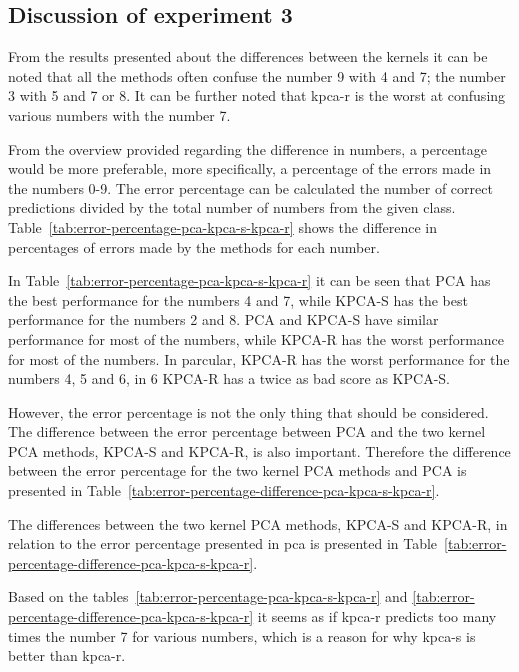 \subsection{Discussion of experiment 3}\label{subsec:discussion-experiment-3}
From the results presented about the differences between the kernels it can be noted that all the methods often confuse the number 9 with 4 and 7; the number 3 with 5 and 7 or 8. It can be further noted that \gls{kpca-r} is the worst at confusing various numbers with the number 7.



From the overview provided regarding the difference in numbers, a percentage would be more preferable, more specifically, a percentage of the errors made in the numbers 0-9. The error percentage can be calculated the number of correct predictions divided by the total number of numbers from the given class. Table~\ref{tab:error-percentage-pca-kpca-s-kpca-r} shows the difference in percentages of errors made by the methods for each number.

In Table~\ref{tab:error-percentage-pca-kpca-s-kpca-r} it can be seen that PCA has the best performance for the numbers 4 and 7, while KPCA-S has the best performance for the numbers 2 and 8. PCA and KPCA-S have similar performance for most of the numbers, while KPCA-R has the worst performance for most of the numbers. In parcular, KPCA-R has the worst performance for the numbers 4, 5 and 6, in 6 KPCA-R has a twice as bad score as KPCA-S. 

However, the error percentage is not the only thing that should be considered. The difference between the error percentage between PCA and the two kernel PCA methods, KPCA-S and KPCA-R, is also important. Therefore the difference between the error percentage for the two kernel PCA methods and PCA is presented in Table~\ref{tab:error-percentage-difference-pca-kpca-s-kpca-r}.


The differences between the two kernel PCA methods, KPCA-S and KPCA-R, in relation to the error percentage presented in \gls{pca} is presented in Table~\ref{tab:error-percentage-difference-pca-kpca-s-kpca-r}.



Based on the tables~\ref{tab:error-percentage-pca-kpca-s-kpca-r} and \ref{tab:error-percentage-difference-pca-kpca-s-kpca-r} it seems as if \gls{kpca-r} predicts too many times the number 7 for various numbers, which is a reason for why \gls{kpca-s} is better than \gls{kpca-r}.


